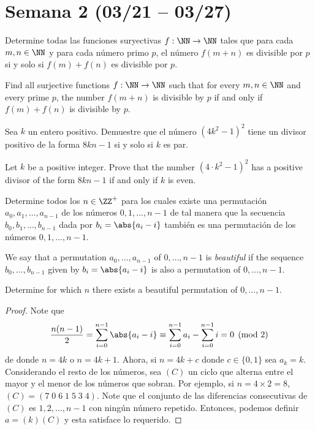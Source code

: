 \section{Semana 2 (03/21 -- 03/27)}


\begin{problem}[ISL 2007/N5]
  Determine todas las funciones suryectivas $f:\NN\to\NN$ tales que para cada
  $m,n\in\NN$ y para cada número primo $p$, el número $f(m+n)$ es divisible por
  $p$ si y solo si $f(m)+f(n)$ es divisible por $p$.
  \begin{hint}
    Find all surjective functions $f:\NN\to\NN$ such that for every $m,n\in\NN$
    and every prime $p$, the number $f(m+n)$ is divisible by $p$ if and only if
    $f(m)+f(n)$ is divisible by $p$.
  \end{hint}
\end{problem}

\begin{problem}[ISL 2007/N6]
  Sea $k$ un entero positivo. Demuestre que el número $(4k^2-1)^2$ tiene un
  divisor positivo de la forma $8kn-1$ si y solo si $k$ es par.
  \begin{hint}
    Let $k$ be a positive integer. Prove that the number $(4\cdot k^2-1)^2$ has
    a positive divisor of the form $8kn-1$ if and only if $k$ is even.
  \end{hint}
\end{problem}

\begin{probER}
  Determine todos los $n\in\ZZ^+$ para los cuales existe una permutación
  $a_0,a_1,\dots,a_{n-1}$ de los números $0,1,\dots,n-1$ de tal manera que la
  secuencia $b_0,b_1,\dots,b_{n-1}$ dada por $b_i=\abs{a_i-i}$ también es una
  permutación de los números $0,1,\dots,n-1$.
  \begin{hint}
    We say that a permutation $a_0,\dots,a_{n-1}$ of $0,\dots,n-1$ is
    \emph{beautiful} if the sequence $b_0,\dots,b_{n-1}$ given by
    $b_i=\abs{a_i-i}$ is also a permutation of $0,\dots,n-1$.

    Determine for which $n$ there exists a beautiful permutation of $0,\dots,n-1$.
  \end{hint}
\end{probER}

\begin{proof}
  Note que
  \[
    \frac{n(n-1)}{2}
    =\sum_{i=0}^{n-1}\abs{a_i-i}
    \equiv\sum_{i=0}^{n-1}a_i-\sum_{i=0}^{n-1}i
    =0\pmod 2
  \]
  de donde $n=4k$ o $n=4k+1$. Ahora, si $n=4k+c$ donde $c\in\{0,1\}$ sea
  $a_k=k$. Considerando el resto de los números, sea $(C)$ un ciclo que alterna
  entre el mayor y el menor de los números que sobran. Por ejemplo, si
  $n=4\times 2=8$, $(C)=(7\;0\;6\;1\;5\;3\;4)$. Note que el conjunto de las
  diferencias consecutivas de $(C)$ es $1,2,\dots,n-1$ con ningún número
  repetido. Entonces, podemos definir $a=(k)(C)$ y esta satisface lo requerido.
\end{proof}

